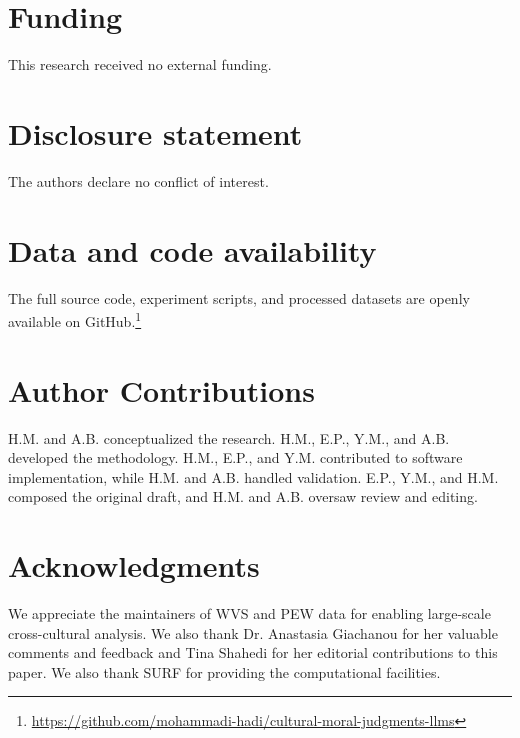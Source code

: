 \documentclass[11pt]{article}
\begin{document}
\section*{Funding}
This research received no external funding.           

\section*{Disclosure statement}
The authors declare no conflict of interest.


\section*{Data and code availability}
The full source code, experiment scripts, and processed datasets are openly available on GitHub.\footnote{\url{https://github.com/mohammadi-hadi/cultural-moral-judgments-llms}}


\section*{Author Contributions}

H.M. and A.B. conceptualized the research. H.M., E.P., Y.M., and A.B. developed the methodology. H.M., E.P., and Y.M. contributed to software implementation, while H.M. and A.B. handled validation. E.P., Y.M., and H.M. composed the original draft, and H.M. and A.B. oversaw review and editing.


\section*{Acknowledgments}
We appreciate the maintainers of WVS and PEW data for enabling large-scale cross-cultural analysis. We also thank Dr. Anastasia Giachanou for her valuable comments and feedback and Tina Shahedi for her editorial contributions to this paper. We also thank SURF for providing the computational facilities.




%

\end{document}
